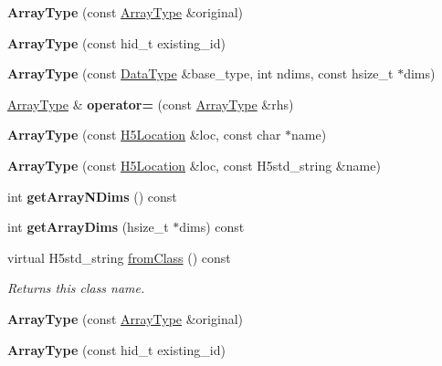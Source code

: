 \begin{DoxyCompactItemize}
{\bfseries Array\+Type} (const \hyperlink{class_h5_1_1_array_type}{Array\+Type} \&original)
\item 
\mbox{\label{class_h5_1_1_array_type_a3713a838ce1074a71945ecd2ed121ecd}} 
{\bfseries Array\+Type} (const hid\+\_\+t existing\+\_\+id)
\item 
\mbox{\label{class_h5_1_1_array_type_a587887d8301ea2991bd60c8472995705}} 
{\bfseries Array\+Type} (const \hyperlink{class_h5_1_1_data_type}{Data\+Type} \&base\+\_\+type, int ndims, const hsize\+\_\+t $\ast$dims)
\item 
\mbox{\label{class_h5_1_1_array_type_ac2fca7c0bbaf3512e612b83cbc1841a6}} 
\hyperlink{class_h5_1_1_array_type}{Array\+Type} \& {\bfseries operator=} (const \hyperlink{class_h5_1_1_array_type}{Array\+Type} \&rhs)
\item 
\mbox{\label{class_h5_1_1_array_type_a006b4d13b11e3d82ecab726a756b4976}} 
{\bfseries Array\+Type} (const \hyperlink{class_h5_1_1_h5_location}{H5\+Location} \&loc, const char $\ast$name)
\item 
\mbox{\label{class_h5_1_1_array_type_aeeef2a9c4be713f968312a23d9fd15e8}} 
{\bfseries Array\+Type} (const \hyperlink{class_h5_1_1_h5_location}{H5\+Location} \&loc, const H5std\+\_\+string \&name)
\item 
\mbox{\label{class_h5_1_1_array_type_afa88edebc3fd8dbcfb589c2144144780}} 
int {\bfseries get\+Array\+N\+Dims} () const
\item 
\mbox{\label{class_h5_1_1_array_type_a9a1e220c180342ea2598be8c8c4400d4}} 
int {\bfseries get\+Array\+Dims} (hsize\+\_\+t $\ast$dims) const
\item 
\mbox{\label{class_h5_1_1_array_type_af1fff9817f1c205a2192241fd79e51c1}} 
virtual H5std\+\_\+string \hyperlink{class_h5_1_1_array_type_af1fff9817f1c205a2192241fd79e51c1}{from\+Class} () const
\begin{DoxyCompactList}\small\item\em Returns this class name. \end{DoxyCompactList}\item 
\mbox{\label{class_h5_1_1_array_type_ac326aa9d5baf6433fc776c5ae8984d3c}} 
{\bfseries Array\+Type} (const \hyperlink{class_h5_1_1_array_type}{Array\+Type} \&original)
\item 
\mbox{\label{class_h5_1_1_array_type_a3713a838ce1074a71945ecd2ed121ecd}} 
{\bfseries Array\+Type} (const hid\+\_\+t existing\+\_\+id)
\end{DoxyCompactItemize}
